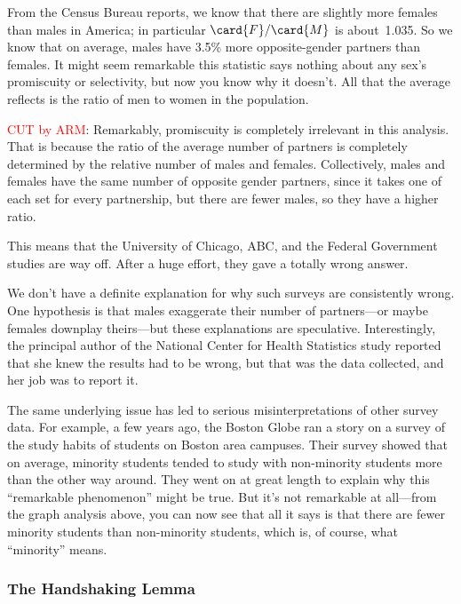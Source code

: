 From the Census Bureau reports, we know that there are slightly more
females than males in America; in particular $\card{F} / \card{M}$ is
about~1.035.  So we know that on average, males have 3.5\% more
opposite-gender partners than females.   It might seem
remarkable this statistic says nothing about any sex's promiscuity or
selectivity, but now you know why it doesn't.  All that the average
reflects is the ratio of men to women in the population.
\begin{editingnotes}
\textcolor{red}{CUT by ARM}: Remarkably, promiscuity is completely irrelevant in this
  analysis.  That is because the ratio of the average number of
  partners is completely determined by the relative number of males
  and females.  Collectively, males and females have the same number
  of opposite gender partners, since it takes one of each set for
  every partnership, but there are fewer males, so they have a higher
  ratio.
\end{editingnotes}
This means that the University of Chicago, ABC, and the Federal
Government studies are way off.  After a huge effort, they gave a
totally wrong answer.

We don't have a definite explanation for why such surveys are consistently
wrong.  One hypothesis is that males exaggerate their number of
partners---or maybe females downplay theirs---but these explanations are
speculative.  Interestingly, the principal author of the National Center
for Health Statistics study reported that she knew the results had to be
wrong, but that was the data collected, and her job was to report it.

The same underlying issue has led to serious misinterpretations of other
survey data.  For example, a few years ago, the Boston Globe ran a story
on a survey of the study habits of students on Boston area campuses.
Their survey showed that on average, minority students tended to study
with non-minority students more than the other way around.  They went on
at great length to explain why this ``remarkable phenomenon'' might be
true.  But it's not remarkable at all---from the graph analysis above, you
can now see that all it says is that there are fewer minority students
than non-minority students, which is, of course, what ``minority'' means.

\subsubsection{The Handshaking Lemma}

